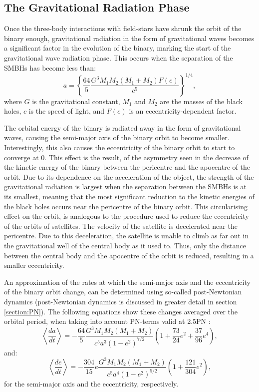 \documentclass[english, twoside]{HYgradu}
\begin{document}
\subsection{The Gravitational Radiation Phase} \label{section:gravitational_radiation}

Once the three-body interactions with field-stars have shrunk the orbit of the binary enough, gravitational radiation in the form of gravitational waves becomes a significant factor in the evolution of the binary, marking the start of the gravitational wave radiation phase. This occurs when the separation of the SMBHs has become less than:
\begin{equation}
a = \left\lbrace \frac{64}{5} \frac{G^3M_1M_2(M_1+M_2)F(e)}{c^5} \right\rbrace^{1/4},
\end{equation}
where $G$ is the gravitational constant, $M_1$ and $M_2$ are the masses of the black holes, $c$ is the speed of light, and $F(e)$ is an eccentricity-dependent factor.

The orbital energy of the binary is radiated away in the form of gravitational waves, causing the semi-major axis of the binary orbit to become smaller. Interestingly, this also causes the eccentricity of the binary orbit to start to converge at $0$. This effect is the result, of the asymmetry seen in the decrease of the kinetic energy of the binary between the pericentre and the apocentre of the orbit. Due to its dependence on the acceleration of the object, the strength of the gravitational radiation is largest when the separation between the SMBHs is at its smallest, meaning that the most significant reduction to the kinetic energies of the black holes occurs near the pericentre of the binary orbit. This circularising effect on the orbit, is analogous to the procedure used to reduce the eccentricity of the orbits of satellites. The velocity of the satellite is decelerated near the pericentre. Due to this deceleration, the satellite is unable to climb as far out in the gravitational well of the central body as it used to. Thus, only the distance between the central body and the apocentre of the orbit is reduced, resulting in a smaller eccentricity.

An approximation of the rates at which the semi-major axis and the eccentricity of the binary orbit change, can be determined using so-called post-Newtonian dynamics (post-Newtonian dynamics is discussed in greater detail in section \ref{section:PN}). The following equations show these changes averaged over the orbital period, when taking into account PN-terms valid at 2.5PN \citep{Peters1964}:
\begin{equation}
\left\langle \frac{da}{dt} \right\rangle = -\frac{64}{5}\frac{G^3M_1M_2(M_1+M_2)}{c^5a^3(1-e^2)^{7/2}} \left( 1+\frac{73}{24}e^2+\frac{37}{96}e^4 \right), \label{eq:pn_dadt}
\end{equation}
and:
\begin{equation}
\left\langle \frac{de}{dt} \right\rangle = -\frac{304}{15}e\frac{G^3M_1M_2(M_1+M_2)}{c^5a^4(1-e^2)^{5/2}} \left( 1+\frac{121}{304}e^2 \right), \label{eq:pn_dedt}
\end{equation}
for the semi-major axis and the eccentricity, respectively. 
\end{document}
